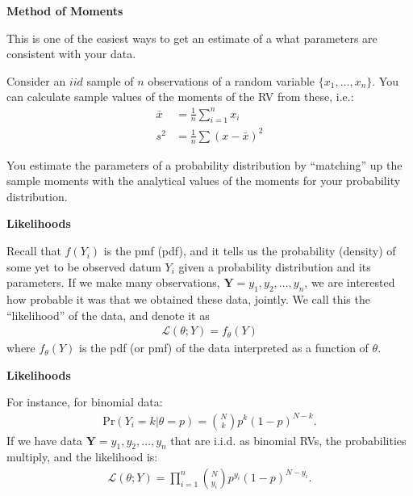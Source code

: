 \documentclass[12pt,xcolor=svgnames]{beamer}
\newcommand{\theme}{\color{FireBrick}}
\newcommand{\mc}[1]{\mathcal{#1}}
\newcommand{\mb}[1]{\mathbf{#1}}
\newcommand{\sk}{\vspace{.4cm}}
\newcommand{\nsk}{\vspace{-.4cm}}
\newcommand{\chap}[1]{{\theme \Large \bf #1} \sk}
\newcommand{\pr}{\text{Pr}}
\newcommand{\mL}{\mc{L}}
\begin{document}
\begin{frame}
\chap{Method of Moments}

This is one of the easiest ways to get an estimate of a what parameters are consistent with your data.

Consider an $iid$ sample of $n$ observations of a  random variable
$\{x_1,\ldots,x_n\}$. You can calculate sample values of the moments of the RV from these, i.e.:
\nsk
\begin{align*}
\bar{x} & =\frac{1}{n} \sum_{i=1}^n x_i \\
s^2 & = \frac{1}{n} \sum (x-\bar{x})^2
\end{align*}

You estimate the parameters of a probability distribution by ``matching'' up the sample moments with the analytical values of the moments for your probability distribution. 
\end{frame}


\begin{frame}
\chap{Likelihoods}

Recall that $f(Y_i)$ is the pmf (pdf), and it tells us the probability (density) of some yet to be observed datum $Y_i$ given a probability distribution and its parameters. If we make many observations, $\mb{Y}=y_1, y_2, \dots, y_n$, we are interested how probable it was that we obtained these data, jointly. We call this the ``likelihood'' of the data, and denote it as 
\begin{align*}
\mL(\theta; Y)=f_\theta(Y)
\end{align*}
where $f_\theta(Y)$ is the pdf (or pmf) of the data interpreted as a function of $\theta$. 

\end{frame}


\begin{frame}
\chap{Likelihoods}

For instance, for binomial data:
\begin{align*}
\pr(Y_i=k | \theta=p)=  {N \choose k} p^k(1-p)^{N-k}.
\end{align*}
If we have data  $\mb{Y}=y_1, y_2, \dots, y_n$ that are i.i.d. as binomial RVs, the probabilities multiply, and the likelihood is:
\begin{align*}
\mL(\theta; Y) = \prod_{i=1}^n {N \choose y_i} p^{y_i}(1-p)^{N-y_i}.
\end{align*}


\end{frame}
\end{document}
